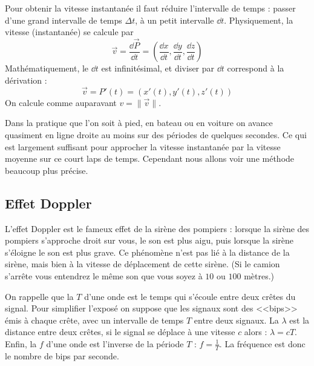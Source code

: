 \documentclass[class=report,crop=false]{standalone}
\newcommand{\vect}{\overrightarrow}
\begin{document}

Pour obtenir la vitesse instantanée il faut réduire l'intervalle de temps : 
passer d'une grand intervalle de temps $\Delta t$, à un petit intervalle 
$\dd t$.
Physiquement, la vitesse (instantanée) se calcule par 
$$\vect v = \frac{\dd \vect P}{\dd t} = \left(\frac{\dd x}{\dd t},\frac{\dd y}{\dd t},\frac{\dd z}{\dd t} \right)$$
Mathématiquement, le $\dd t$ est infinitésimal, et diviser par $\dd t$ correspond 
à la dérivation :
$$\vect v = P'(t) = \left( x'(t), y'(t), z'(t) \right)$$
On calcule comme auparavant $v = \| \vect v\|$.

Dans la pratique que l'on soit à pied, en bateau ou en voiture on avance
quasiment en ligne droite au moins sur des périodes de quelques secondes.
Ce qui est largement suffisant pour approcher la vitesse instantanée par
la vitesse moyenne sur ce court laps de temps.
Cependant nous allons voir une méthode beaucoup plus précise.



\subsection{Effet Doppler}

L'effet Doppler est le fameux effet de la sirène des pompiers :
lorsque la sirène des pompiers s'approche droit sur vous, le son est plus aigu, 
puis lorsque la sirène s'éloigne le son est plus grave. Ce phénomène n'est pas lié à la distance
de la sirène, mais bien à la vitesse de déplacement de cette sirène.
(Si le camion s'arrête vous entendrez le même son que vous soyez à
$10$ ou $100$ mètres.)


\bigskip

On rappelle que la  $T$ d'une onde est le temps qui s'écoule entre 
deux crêtes du signal. Pour simplifier l'exposé on suppose que les signaux sont
des <<bips>> émis à chaque crête, avec un intervalle de temps $T$ entre deux signaux.
La  $\lambda$ est la distance entre deux crêtes, 
si le signal se déplace à une vitesse $c$ alors : $\lambda = c T$.
Enfin, la  $f$ d'une onde est l'inverse de la période $T$ : $f = \frac{1}{T}$.
La fréquence est donc le nombre de bips par seconde. 
\end{document}
